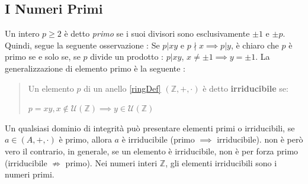 \documentclass[12pt, letterpaper]{article}
\begin{document}
\subsection{I Numeri Primi}
Un intero \(p\ge 2\) è detto \textit{primo} se i suoi divisori sono esclusivamente \(\pm 1\) e \(\pm p\). Quindi,
 segue la seguente osservazione : Se \(p|xy\) e \(p\nmid x \implies p|y\), è chiaro che \(p\) è primo 
 se e solo se, se \(p\) divide un prodotto : \(p|xy\), \(x\ne \pm1\implies y=\pm 1\). La generalizzazione 
 di elemento primo è la seguente :
 \begin{quote}
    Un elemento \(p\) di un anello \ref{ringDef} \((\mathbb{Z},+,\cdot)\) è detto \textbf{irriducibile} se:\begin{center} \(p=xy, x\notin \mathcal{U}(\mathbb{Z})\implies y\in \mathcal{U}(\mathbb{Z})\) 
    \end{center}\end{quote}
Un qualsiasi dominio di integrità può presentare elementi primi o irriducibili, se \(a\in (A,+,\cdot)\) è primo, 
allora \(a\) è irriducibile (primo \(\implies\) irriducibile). non è però vero il contrario, in generale, se un elemento 
è irriducibile, non è per forza primo (irriducibile \(\nRightarrow \) primo). Nei numeri interi \(\mathbb{Z}\), 
gli elementi irriducibili sono i numeri primi. 
\end{document}

